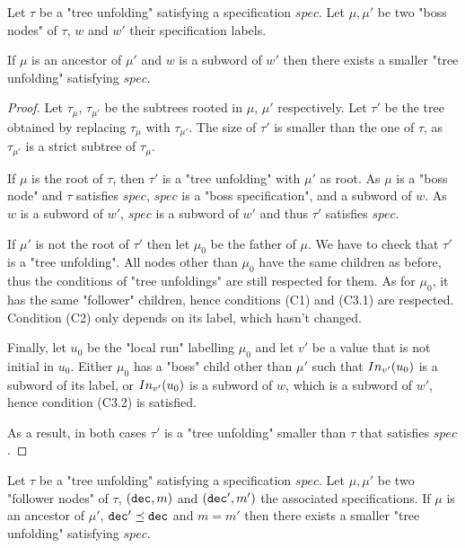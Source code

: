 \begin{lemma}
	Let $\tau$ be a "tree unfolding" satisfying a specification $spec$.
	Let $\mu, \mu'$ be two "boss nodes" of $\tau$, $w$ and $w'$ their specification labels.
	
	If $\mu$ is an ancestor of $\mu'$ and $w$ is a subword of $w'$ then there exists a smaller "tree unfolding" satisfying $spec$.  
\end{lemma}

\begin{proof}
	Let $\tau_{\mu}$, $\tau_{\mu'}$ be the subtrees rooted in $\mu$, $\mu'$ respectively. 
	Let $\tau'$ be the tree obtained by replacing $\tau_{\mu}$ with $\tau_{\mu'}$. The size of $\tau'$ is smaller than the one of $\tau$, as $\tau_{\mu'}$ is a strict subtree of $\tau_{\mu}$.
	
	If $\mu$ is the root of $\tau$, then $\tau'$ is a "tree unfolding" with $\mu'$ as root. As $\mu$ is a "boss node" and $\tau$ satisfies $spec$, $spec$ is a "boss specification", and a subword of $w$. 
	As $w$ is a subword of $w'$, $spec$ is a subword of $w'$ and thus $\tau'$ satisfies $spec$.
	
	If  $\mu'$ is not the root of $\tau'$ then let $\mu_0$ be the father of $\mu$. We have to check that $\tau'$ is a "tree unfolding". 
	All nodes other than $\mu_0$ have the same children as before, thus the conditions of "tree unfoldings" are still respected for them.
	As for $\mu_0$, it has the same "follower" children, hence conditions (C1) and (C3.1) are respected. Condition (C2) only depends on its label, which hasn't changed.
	
	Finally, let $u_0$ be the "local run" labelling $\mu_0$ and let $v'$ be a value that is not initial in $u_0$. Either $\mu_0$ has a "boss" child other than $\mu'$ such that $In_{v'}(u_0)$ is a subword of its label, or $In_{v'}(u_0)$ is a subword of $w$, which is a subword of $w'$, hence condition (C3.2) is satisfied. 
	
	As a result, in both cases $\tau'$ is a "tree unfolding" smaller than $\tau$ that satisfies $spec$. 
\end{proof}

\begin{lemma}
	Let $\tau$ be a "tree unfolding" satisfying a specification $spec$.
	Let $\mu, \mu'$ be two "follower nodes" of $\tau$, $(\mathtt{dec},m)$ and $(\mathtt{dec}',m')$ the associated specifications.
	If $\mu$ is an ancestor of $\mu'$, $\mathtt{dec}' \preceq \mathtt{dec}$ and $m=m'$ then there exists a smaller "tree unfolding" satisfying $spec$. 
\end{lemma}

